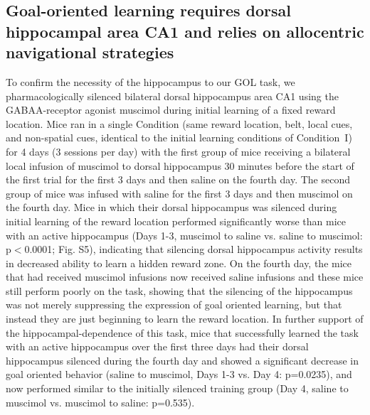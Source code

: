 \subsection{Goal-oriented learning requires dorsal hippocampal area CA1 and relies on allocentric navigational strategies}

To confirm the necessity of the hippocampus to our GOL task, we pharmacologically silenced bilateral dorsal hippocampus area CA1 using the GABAA-receptor agonist muscimol during initial learning of a fixed reward location. Mice ran in a single Condition (same reward location, belt, local cues, and non-spatial cues, identical to the initial learning conditions of Condition~I) for 4 days (3 sessions per day) with the first group of mice receiving a bilateral local infusion of muscimol to dorsal hippocampus 30 minutes before the start of the first trial for the first 3 days and then saline on the fourth day. The second group of mice was infused with saline for the first 3 days and then muscimol on the fourth day. Mice in which their dorsal hippocampus was silenced during initial learning of the reward location performed significantly worse than mice with an active hippocampus (Days 1-3, muscimol to saline vs. saline to muscimol: p$<$0.0001; Fig. S5), indicating that silencing dorsal hippocampus activity results in decreased ability to learn a hidden reward zone. On the fourth day, the mice that had received muscimol infusions now received saline infusions and these mice still perform poorly on the task, showing that the silencing of the hippocampus was not merely suppressing the expression of goal oriented learning, but that instead they are just beginning to learn the reward location. In further support of the hippocampal-dependence of this task, mice that successfully learned the task with an active hippocampus over the first three days had their dorsal hippocampus silenced during the fourth day and showed a significant decrease in goal oriented behavior (saline to muscimol, Days 1-3 vs. Day 4: p=0.0235), and now performed similar to the initially silenced training group (Day 4, saline to muscimol vs. muscimol to saline: p=0.535).

